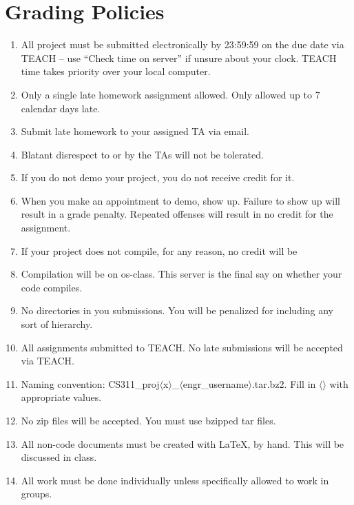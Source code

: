 \documentclass[10pt, letterpaper]{article}
\newcommand{\q}[1]{``#1''}
\numberwithin{equation}{section}
\begin{document}
\section*{Grading Policies}
\hrulefill \newline
\begin{enumerate}
	\item All project must be submitted electronically by 23:59:59 on the due date via TEACH $–$ use \q{Check time on server} if unsure about your clock. TEACH time takes priority over your local computer. \hfill
	\item Only a single late homework assignment allowed. Only allowed up to 7 calendar days late. \hfill
	\item Submit late homework to your assigned TA via email. \hfill
	\item Blatant disrespect to or by the TAs will not be tolerated. \hfill
	\item If you do not demo your project, you do not receive credit for it. \hfill
	\item When you make an appointment to demo, show up. Failure to show up will result in a grade penalty. Repeated offenses will result in no credit for the assignment. \hfill
	\item If your project does not compile, for any reason, no credit will be \hfill
	\item Compilation will be on os-class. This server is the final say on whether your code compiles. \hfill
	\item No directories in you submissions. You will be penalized for including any sort of hierarchy. \hfill
	\item All assignments submitted to TEACH. No late submissions will be accepted via TEACH. \hfill
	\item Naming convention: CS311\_proj$\langle$x$\rangle$\_$\langle$engr\_username$\rangle$.tar.bz2. Fill in $\langle \rangle$ with appropriate values. \hfill
	\item No zip files will be accepted. You must use bzipped tar files. \hfill
	\item All non-code documents must be created with LaTeX, by hand. This will be discussed in class. \hfill
	\item All work must be done individually unless specifically allowed to work in groups. \hfill
\end{enumerate}
\end{document}
